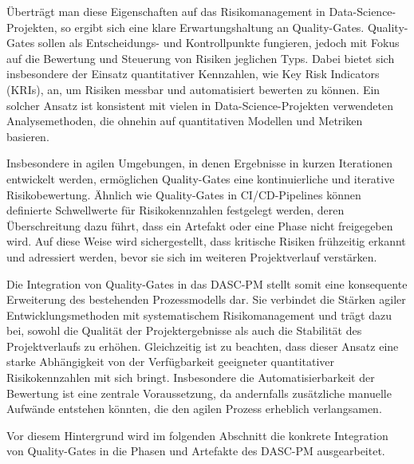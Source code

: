 Überträgt man diese Eigenschaften auf das Risikomanagement in Data-Science-Projekten, so ergibt sich eine klare Erwartungshaltung 
an Quality-Gates. 
Quality-Gates sollen als Entscheidungs- und Kontrollpunkte fungieren, jedoch mit Fokus auf die Bewertung und 
Steuerung von Risiken jeglichen Typs.
Dabei bietet sich insbesondere der Einsatz quantitativer Kennzahlen, wie Key Risk Indicators (KRIs), an, um Risiken messbar und 
automatisiert bewerten zu können.
Ein solcher Ansatz ist konsistent mit vielen in Data-Science-Projekten verwendeten Analysemethoden, die ohnehin auf quantitativen 
Modellen und Metriken basieren.

Insbesondere in agilen Umgebungen, in denen Ergebnisse in kurzen Iterationen entwickelt werden, ermöglichen Quality-Gates eine 
kontinuierliche und iterative Risikobewertung.
Ähnlich wie Quality-Gates in CI/CD-Pipelines können definierte Schwellwerte für Risikokennzahlen festgelegt werden, deren 
Überschreitung dazu führt, dass ein Artefakt oder eine Phase nicht freigegeben wird.
Auf diese Weise wird sichergestellt, dass kritische Risiken frühzeitig erkannt und adressiert werden, bevor sie sich im weiteren 
Projektverlauf verstärken.

Die Integration von Quality-Gates in das DASC-PM stellt somit eine konsequente Erweiterung des bestehenden Prozessmodells dar.
Sie verbindet die Stärken agiler Entwicklungsmethoden mit systematischem Risikomanagement und trägt dazu bei, sowohl die Qualität 
der Projektergebnisse als auch die Stabilität des Projektverlaufs zu erhöhen.
Gleichzeitig ist zu beachten, dass dieser Ansatz eine starke Abhängigkeit von der Verfügbarkeit geeigneter quantitativer 
Risikokennzahlen mit sich bringt.
Insbesondere die Automatisierbarkeit der Bewertung ist eine zentrale Voraussetzung, da andernfalls zusätzliche manuelle 
Aufwände entstehen könnten, die den agilen Prozess erheblich verlangsamen.

Vor diesem Hintergrund wird im folgenden Abschnitt die konkrete Integration von Quality-Gates in die Phasen und Artefakte des 
DASC-PM ausgearbeitet.